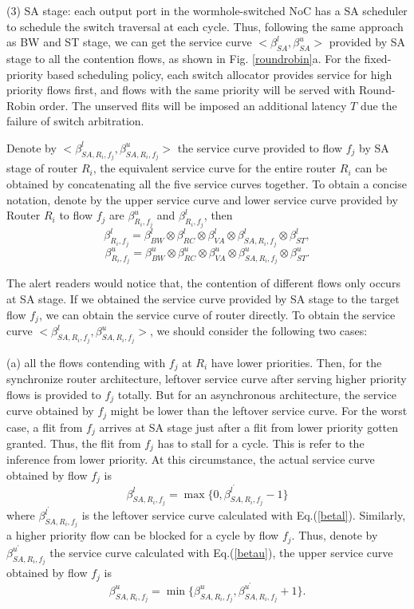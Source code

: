 \documentclass[10pt,journal]{IEEEtran}
\begin{document}
(3) SA stage: each output port in the wormhole-switched NoC has a SA scheduler to schedule the switch traversal at each cycle. Thus, following the same approach as BW and ST stage, we can get the service curve $<\beta_{SA}^l,\beta_{SA}^u>$ provided by SA stage to all the contention flows, as shown in Fig. \ref{roundrobin}a. For the fixed-priority based scheduling policy, each switch allocator provides service for high priority flows first, and flows with the same priority will be served with Round-Robin order. The unserved flits will be imposed an additional latency $T$ due the failure of switch arbitration.

Denote by $<\beta_{SA,R_i,f_j}^l,\beta_{SA,R_i,f_j}^u>$ the service curve provided to flow $f_j$ by SA stage of router $R_i$, the equivalent service curve for the entire router $R_i$ can be obtained by concatenating all the five service curves together. To obtain a concise notation, denote by the upper service curve and lower service curve provided by Router $R_i$ to flow $f_j$ are $\beta_{R_i,f_j}^u$ and $\beta_{R_i,f_j}^l$, then
$$\beta_{R_i,f_j}^l=\beta_{BW}^l\otimes\beta_{RC}^l\otimes\beta_{VA}^l\otimes\beta_{SA,R_i,f_j}^l\otimes \beta_{ST}^l,$$
$$\beta_{R_i,f_j}^u=\beta_{BW}^u\otimes\beta_{RC}^u\otimes\beta_{VA}^u\otimes\beta_{SA,R_i,f_j}^u\otimes \beta_{ST}^u.$$

The alert readers would notice that, the contention of different flows only occurs at SA stage. If we obtained the service curve provided by SA stage to the target flow $f_j$, we can obtain the service curve of router directly. To obtain the service curve $<\beta_{SA,R_i,f_j}^l,\beta_{SA,R_i,f_j}^u>$, we should consider the following two cases:

(a) all the flows contending with $f_j$ at $R_i$ have lower priorities. Then, for the synchronize router architecture, leftover service curve after serving higher priority flows is provided to $f_j$ totally. But for an asynchronous architecture, the service curve obtained by $f_j$ might be lower than the leftover service curve. For the worst case, a flit from $f_j$ arrives at SA stage just after a flit from lower priority gotten granted. Thus, the flit from $f_j$ has to stall for a cycle. This is refer to the inference from lower priority. At this circumstance, the actual service curve obtained by flow $f_j$ is
\begin{equation}\label{nonpreemptbetal}
\beta^{l}_{SA,R_i,f_j}=\max\{0,\beta^{l^\prime}_{SA,R_i,f_j}-1\}
\end{equation}
where $\beta^{l^\prime}_{SA,R_i,f_j}$ is the leftover service curve calculated with Eq.(\ref{betal}). Similarly, a higher priority flow can be blocked for a cycle by flow $f_j$. Thus, denote by $\beta^{u^\prime}_{SA,R_i,f_j}$ the service curve calculated with Eq.(\ref{betau}), the upper service curve obtained by flow $f_j$ is
\begin{equation}\label{nonpreemptbetau}
\beta^{u}_{SA,R_i,f_j}=\min\{\beta^{u}_{SA,R_i,f_j},\beta^{u^\prime}_{SA,R_i,f_j}+1\}.
\end{equation}
\end{document}
